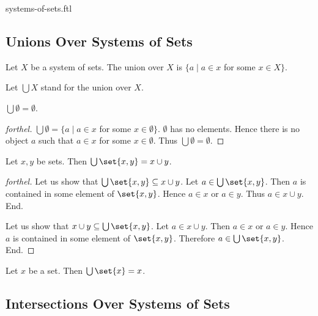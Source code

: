 \documentclass{naproche-library}
\begin{document}
\begin{smodule}{systems-of-sets.ftl}
  \subsection*{Unions Over Systems of Sets}

  \begin{definition}[forthel,id=FOUNDATIONS_10_541772562300928]
    Let $X$ be a system of sets.
    The union over $X$ is $\{ a \mid a \in x$ for some $x \in X \}$.

    Let $\bigcup X$ stand for the union over $X$.
  \end{definition}

  \begin{proposition}[forthel,id=FOUNDATIONS_10_4872701241982976]
    $\bigcup \emptyset = \emptyset$.
  \end{proposition}
  \begin{proof}[forthel]
    $\bigcup \emptyset = \{ a \mid a \in x$ for some $x \in \emptyset \}$.
    $\emptyset$ has no elements.
    Hence there is no object $a$ such that $a \in x$ for some $x \in \emptyset$.
    Thus $\bigcup \emptyset = \emptyset$.
  \end{proof}

  \begin{proposition}[forthel,id=FOUNDATIONS_10_2559541585641472]
    Let $x, y$ be sets.
    Then $\bigcup \set{x, y} = x \cup y$.
  \end{proposition}
  \begin{proof}[forthel]
    Let us show that $\bigcup \set{x, y} \subseteq x \cup y$.
      Let $a \in \bigcup \set{x, y}$.
      Then $a$ is contained in some element of $\set{x, y}$.
      Hence $a \in x$ or $a \in y$.
      Thus $a \in x \cup y$.
    End.

    Let us show that $x \cup y \subseteq \bigcup \set{x, y}$.
      Let $a \in x \cup y$.
      Then $a \in x$ or $a \in y$.
      Hence $a$ is contained in some element of $\set{x, y}$.
      Therefore $a \in \bigcup \set{x, y}$.
    End.
  \end{proof}

  \begin{corollary}[forthel,id=FOUNDATIONS_10_2157223832715264]
    Let $x$ be a set.
    Then $\bigcup \set{x} = x$.
  \end{corollary}


  \subsection*{Intersections Over Systems of Sets}


\end{smodule}
\end{document}
